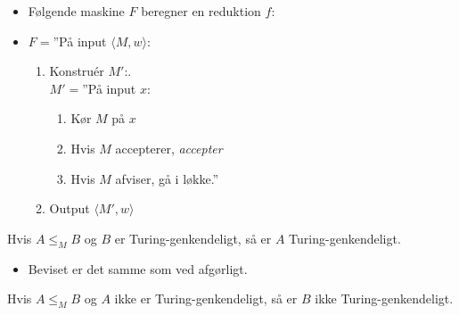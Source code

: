 \begin{frame}[allowframebreaks]
\begin{itemize}
		\item Følgende maskine $F$ beregner en reduktion $f$:
		\item $F =$''På input \(\langle M , w \rangle\):
		      \begin{enumerate}
			      \item Konstruér $M'$:. \\
			            $M' = $''På input $x$:
			            \begin{enumerate}
				            \item Kør $M$ på $x$
				            \item Hvis $M$ accepterer, \textit{accepter}
				            \item Hvis $M$ afviser, gå i løkke.''
			            \end{enumerate}
			      \item Output \(\langle M', w \rangle\)
		      \end{enumerate}
	\end{itemize}

	\begin{theorem}
		Hvis $A \le_{M} B$ og $B$ er Turing-genkendeligt, så er $A$ Turing-genkendeligt.
	\end{theorem}
	\begin{itemize}
		\item Beviset er det samme som ved afgørligt.
	\end{itemize}

	\begin{corollary}
		Hvis $A \le_{M} B$ og $A$ ikke er Turing-genkendeligt, så er $B$ ikke Turing-genkendeligt.
	\end{corollary}


\end{frame}
